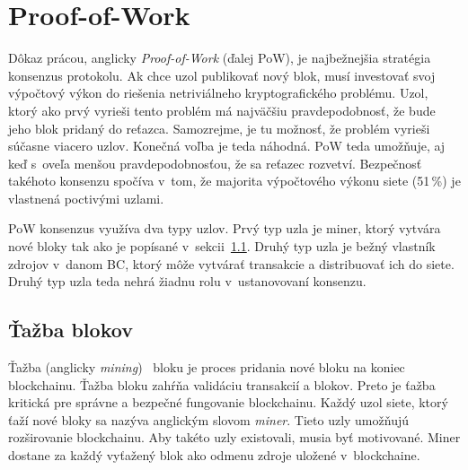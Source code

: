 \section{Proof-of-Work}\label{sec:pow}
Dôkaz prácou, anglicky \textit{Proof-of-Work} (ďalej PoW), je najbežnejšia stratégia konsenzus protokolu. Ak chce uzol publikovať nový blok, musí investovať svoj výpočtový výkon do riešenia netriviálneho kryptografického problému. Uzol, ktorý ako prvý vyrieši tento problém má najväčšiu pravdepodobnosť, že bude jeho blok pridaný do reťazca. Samozrejme, je tu možnosť, že problém vyrieši súčasne viacero uzlov. Konečná voľba je teda náhodná. PoW teda umožňuje, aj keď s~oveľa menšou pravdepodobnosťou, že sa reťazec rozvetví. Bezpečnosť takéhoto konsenzu spočíva v~tom, že majorita výpočtového výkonu siete (51\,\%) je vlastnená poctivými uzlami.

PoW konsenzus využíva dva typy uzlov. Prvý typ uzla je miner, ktorý vytvára nové bloky tak ako je popísané v~sekcii~\ref{sec:mining}. Druhý typ uzla je bežný vlastník zdrojov v~danom BC, ktorý môže vytvárať transakcie a distribuovať ich do siete. Druhý typ uzla teda nehrá žiadnu rolu v~ustanovovaní konsenzu.~\cite{leporeConsensus}

\subsection{Ťažba blokov}\label{sec:mining}

Ťažba (anglicky \textit{mining})~\cite{narayanan2016bitcoin} bloku je proces pridania nové bloku na koniec blockchainu. Ťažba bloku zahŕňa validáciu transakcií a blokov. Preto je ťažba kritická pre správne a bezpečné fungovanie blockchainu. Každý uzol siete, ktorý ťaží nové bloky sa nazýva anglickým slovom \textit{miner}. Tieto uzly umožňujú rozširovanie blockchainu. Aby takéto uzly existovali, musia byť motivované. Miner dostane za každý vyťažený blok ako odmenu zdroje uložené v~blockchaine.

